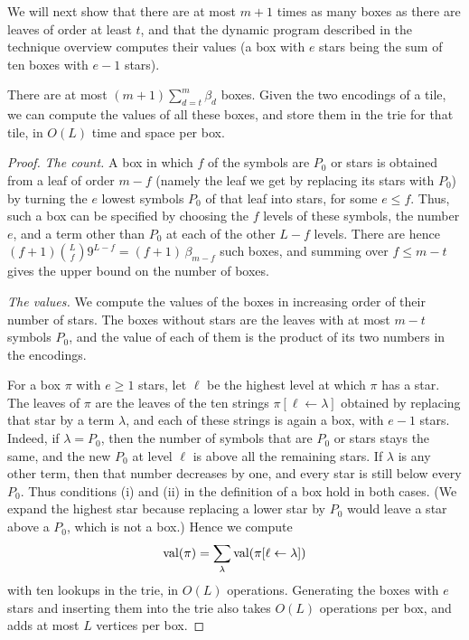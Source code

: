 We will next show that there are at most $m+1$ times as many boxes as there are leaves of order at least $t$, and that the dynamic program described in the technique overview computes their values (a box with $e$ stars being the sum of ten boxes with $e-1$ stars).

\begin{lemma}\label{lem:allboxes}
There are at most $(m+1)\sum_{d=t}^{m}\beta_d$ boxes. Given the two encodings of a tile, we can compute the values of all these boxes, and store them in the trie for that tile, in $O(L)$ time and space per box.
\end{lemma}

\begin{proof}
\emph{The count.} A box in which $f$ of the symbols are $P_0$ or stars is obtained from a leaf of order $m-f$ (namely the leaf we get by replacing its stars with $P_0$) by turning the $e$ lowest symbols $P_0$ of that leaf into stars, for some $e\le f$. Thus, such a box can be specified by choosing the $f$ levels of these symbols, the number $e$, and a term other than $P_0$ at each of the other $L-f$ levels. There are hence $(f+1)\binom Lf9^{L-f}=(f+1)\,\beta_{m-f}$ such boxes, and summing over $f\le m-t$ gives the upper bound on the number of boxes.

\emph{The values.} We compute the values of the boxes in increasing order of their number of stars. The boxes without stars are the leaves with at most $m-t$ symbols $P_0$, and the value of each of them is the product of its two numbers in the encodings.

For a box $\pi$ with $e\ge1$ stars, let $\ell$ be the highest level at which $\pi$ has a star. The leaves of $\pi$ are the leaves of the ten strings $\pi[\ell\leftarrow\lambda]$ obtained by replacing that star by a term $\lambda$, and each of these strings is again a box, with $e-1$ stars. Indeed, if $\lambda=P_0$, then the number of symbols that are $P_0$ or stars stays the same, and the new $P_0$ at level $\ell$ is above all the remaining stars. If $\lambda$ is any other term, then that number decreases by one, and every star is still below every $P_0$. Thus conditions (i) and (ii) in the definition of a box hold in both cases. (We expand the highest star because replacing a lower star by $P_0$ would leave a star above a $P_0$, which is not a box.) Hence we compute
\[
\mathrm{val}(\pi)=\sum_\lambda\mathrm{val}(\pi[\ell\leftarrow\lambda])
\]
with ten lookups in the trie, in $O(L)$ operations. Generating the boxes with $e$ stars and inserting them into the trie also takes $O(L)$ operations per box, and adds at most $L$ vertices per box.
\end{proof}

